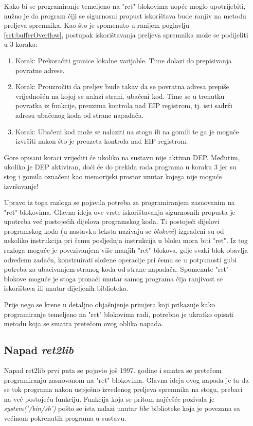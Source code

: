 \documentclass[times, utf8, diplomski, numeric]{fer}
\begin{document}
Kako bi se programiranje temeljeno na "ret" blokovima uopće moglo upotrijebiti, nužno je da program čiji se sigurnosni propust iskorištava bude ranjiv na metodu preljeva spremnika. Kao što je spomenuto u ranijem poglavlju \ref{sct:bufferOverflow}, postupak iskorištavanja preljeva spremnika može se podijeliti u 3 koraka:
\begin{enumerate}
\item Korak: Prekoračiti granice lokalne varijable. Time dolazi do prepisivanja povratne adrese.
\item Korak: Prouzročiti da preljev bude takav da se povratna adresa prepiše vrijednošću na kojoj se nalazi strani, ubačeni kod. Time se u trenutku povratka iz funkcije, preuzima kontrola nad EIP registrom, tj. isti sadrži adresu ubačenog koda od strane napadača.
\item Korak: Ubačeni kod može se nalaziti na stogu ili na gomili te ga je moguće izvršiti nakon što je preuzeta kontrola nad EIP registrom.
\end{enumerate}
Gore opisani koraci vrijediti će ukoliko na sustavu nije aktivan DEP. Međutim, ukoliko je DEP aktiviran, doći će do prekida rada programa u koraku 3 jer su stog i gomila označeni kao memorijski prostor unutar kojega nije moguće izvršavanje!

Upravo iz toga razloga se pojavila potreba za programiranjem zasnovanim na "ret" blokovima. Glavna ideja ove vrste iskorištavanja sigurnosnih propusta je upotreba već postojećih dijelova programskog koda. Ti postojeći dijelovi programskog koda (u nastavku teksta nazivaju se \emph{blokovi}) izgrađeni su od nekoliko instrukcija pri čemu posljednja instrukcija u bloku mora biti "ret". Iz tog razloga moguće je povezivanjem više manjih "ret" blokova, gdje svaki blok obavlja određenu zadaću, konstruirati složene operacije pri čemu se u potpunosti gubi potreba za ubacivanjem stranog koda od strane napadača. Spomenute "ret" blokove moguće je stoga pronaći unutar samog programa čija ranjivost se iskorištava ili unutar dijeljenih biblioteka.

Prije nego se krene u detaljno objašnjenje primjera koji prikazuje kako programiranje temeljeno na "ret" blokovima radi, potrebno je ukratko opisati metodu koja se smatra pretečom ovog oblika napada.

\subsection{Napad \emph{ret2lib}}
Napad ret2lib prvi puta se pojavio još 1997. godine \citep{ret2lib_official} i smatra se pretečom programiranju zasnovanom na "ret" blokovima. Glavna ideja ovog napada je ta da se tok programa nakon uspješno izvedenog preljeva spremnika na stogu, prebaci na već postojeću funkciju. Funkcija koja se pritom najčešće pozivala je \emph{system('/bin/sh')} pošto se ista nalazi unutar \emph{libc} biblioteke koja je povezana sa većinom pokrenutih programa u sustavu.
\end{document}
